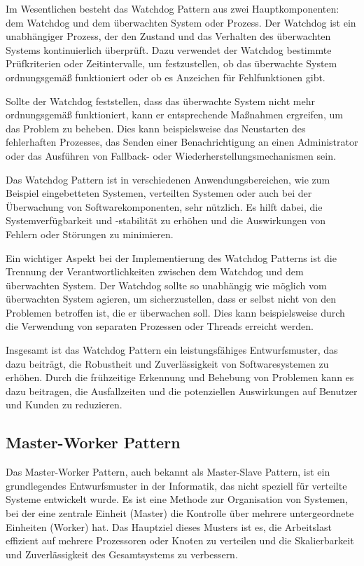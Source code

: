 \documentclass[../vs-script-first-v01.tex]{subfiles}
\begin{document}
Im Wesentlichen besteht das Watchdog Pattern aus zwei Hauptkomponenten: dem Watchdog und dem überwachten System oder Prozess. Der Watchdog ist ein unabhängiger Prozess, der den Zustand und das Verhalten des überwachten Systems kontinuierlich überprüft. Dazu verwendet der Watchdog bestimmte Prüfkriterien oder Zeitintervalle, um festzustellen, ob das überwachte System ordnungsgemäß funktioniert oder ob es Anzeichen für Fehlfunktionen gibt.

Sollte der Watchdog feststellen, dass das überwachte System nicht mehr ordnungsgemäß funktioniert, kann er entsprechende Maßnahmen ergreifen, um das Problem zu beheben. Dies kann beispielsweise das Neustarten des fehlerhaften Prozesses, das Senden einer Benachrichtigung an einen Administrator oder das Ausführen von Fallback- oder Wiederherstellungsmechanismen sein.

Das Watchdog Pattern ist in verschiedenen Anwendungsbereichen, wie zum Beispiel eingebetteten Systemen, verteilten Systemen oder auch bei der Überwachung von Softwarekomponenten, sehr nützlich. Es hilft dabei, die Systemverfügbarkeit und -stabilität zu erhöhen und die Auswirkungen von Fehlern oder Störungen zu minimieren.

Ein wichtiger Aspekt bei der Implementierung des Watchdog Patterns ist die Trennung der Verantwortlichkeiten zwischen dem Watchdog und dem überwachten System. Der Watchdog sollte so unabhängig wie möglich vom überwachten System agieren, um sicherzustellen, dass er selbst nicht von den Problemen betroffen ist, die er überwachen soll. Dies kann beispielsweise durch die Verwendung von separaten Prozessen oder Threads erreicht werden.

Insgesamt ist das Watchdog Pattern ein leistungsfähiges Entwurfsmuster, das dazu beiträgt, die Robustheit und Zuverlässigkeit von Softwaresystemen zu erhöhen. Durch die frühzeitige Erkennung und Behebung von Problemen kann es dazu beitragen, die Ausfallzeiten und die potenziellen Auswirkungen auf Benutzer und Kunden zu reduzieren.

\subsection{Master-Worker Pattern}
Das Master-Worker Pattern, auch bekannt als Master-Slave Pattern, ist ein grundlegendes Entwurfsmuster in der Informatik, das nicht speziell für verteilte Systeme entwickelt wurde. Es ist eine Methode zur Organisation von Systemen, bei der eine zentrale Einheit (Master) die Kontrolle über mehrere untergeordnete Einheiten (Worker) hat. Das Hauptziel dieses Musters ist es, die Arbeitslast effizient auf mehrere Prozessoren oder Knoten zu verteilen und die Skalierbarkeit und Zuverlässigkeit des Gesamtsystems zu verbessern.
\end{document}
